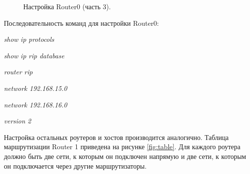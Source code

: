 \documentclass[a4paper,14pt]{article}
\begin{document}
\newpage
\begin{figure}[!h]
    \caption{Настройка Router0 (часть 3).}
    \label{fig:r0_set3}
\end{figure}

Последовательность команд для настройки Router0:

\textit{show ip protocols}

\textit{show ip rip database}

\textit{router rip}

\textit{network 192.168.15.0}

\textit{network 192.168.16.0}

\textit{version 2}

Настройка остальных роутеров и хостов производится аналогично. Таблица маршрутизации Router 1 приведена на рисунке \ref{fig:table}. Для каждого роутера должно быть две сети, к которым он подключен напрямую и две сети, к которым он подключается через другие маршрутизаторы.
\end{document}
